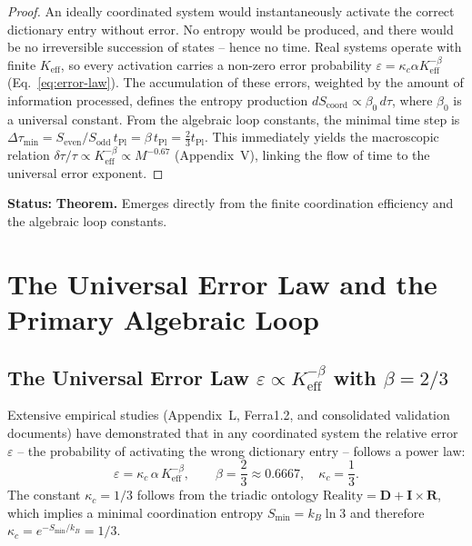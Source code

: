 \documentclass[12pt,a4paper]{article}
\begin{document}
	\begin{proof}
		An ideally coordinated system would instantaneously activate the correct dictionary entry without error. No entropy would be produced, and there would be no irreversible succession of states -- hence no time. Real systems operate with finite \(K_{\mathrm{eff}}\), so every activation carries a non-zero error probability \(\varepsilon = \kappa_c \alpha K_{\mathrm{eff}}^{-\beta}\) (Eq.~\ref{eq:error-law}). The accumulation of these errors, weighted by the amount of information processed, defines the entropy production \(dS_{\mathrm{coord}} \propto \beta_0 \, d\tau\), where \(\beta_0\) is a universal constant. From the algebraic loop constants, the minimal time step is \(\Delta \tau_{\min} = S_{\mathrm{even}}/S_{\mathrm{odd}} \, t_{\mathrm{Pl}} = \beta \, t_{\mathrm{Pl}} = \frac{2}{3} t_{\mathrm{Pl}}\). This immediately yields the macroscopic relation \(\delta\tau/\tau \propto K_{\mathrm{eff}}^{-\beta} \propto M^{-0.67}\) (Appendix~V), linking the flow of time to the universal error exponent.
	\end{proof}
	
	\textbf{Status:} \textbf{Theorem.} Emerges directly from the finite coordination efficiency and the algebraic loop constants.
	
	\section{The Universal Error Law and the Primary Algebraic Loop}
	\label{sec:error-law}
	
	\subsection{The Universal Error Law \(\varepsilon \propto K_{\mathrm{eff}}^{-\beta}\) with \(\beta = 2/3\)}
	
	Extensive empirical studies (Appendix~L, Ferra1.2, and consolidated validation documents) have demonstrated that in any coordinated system the relative error \(\varepsilon\) -- the probability of activating the wrong dictionary entry -- follows a power law:
	\begin{equation}
		\boxed{\varepsilon = \kappa_c \, \alpha \, K_{\mathrm{eff}}^{-\beta}, \qquad \beta = \frac{2}{3} \approx 0.6667,\quad \kappa_c = \frac{1}{3}}.
		\label{eq:error-law}
	\end{equation}
	The constant \(\kappa_c = 1/3\) follows from the triadic ontology \(\text{Reality} = \mathbf{D} + \mathbf{I} \times \mathbf{R}\), which implies a minimal coordination entropy \(S_{\min} = k_B \ln 3\) and therefore \(\kappa_c = e^{-S_{\min}/k_B} = 1/3\).
	
\end{document}
